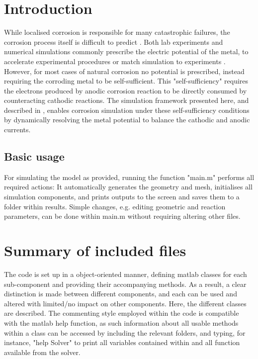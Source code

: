 \documentclass[3p]{elsarticle} %
\begin{document}
\section{Introduction}
While localised corrosion is responsible for many catastrophic failures, the corrosion process itself is difficult to predict \citep{Galvele1976}. Both lab experiments and numerical simulations commonly prescribe the electric potential of the metal, to accelerate experimental procedures or match simulation to experiments \citep{Gravano1984, Sun2021, Laycock2001, Mai2016, Nguyen2022, Li2020}. However, for most cases of natural corrosion no potential is prescribed, instead requiring the corroding metal to be self-sufficient. This "self-sufficiency" requires the electrons produced by anodic corrosion reaction to be directly consumed by counteracting cathodic reactions. The simulation framework presented here, and described in \citep{Hageman2023}, enables corrosion simulation under these self-sufficiency conditions by dynamically resolving the metal potential to balance the cathodic and anodic currents. 

\subsection{Basic usage}
For simulating the model as provided, running the function "main.m" performs all required actions: It automatically generates the geometry and mesh, initialises all simulation components, and prints outputs to the screen and saves them to a folder within results. Simple changes, e.g. editing geometric and reaction parameters, can be done within main.m without requiring altering other files. 

\section{Summary of included files}
The code is set up in a object-oriented manner, defining matlab classes for each sub-component and providing their accompanying methods. As a result, a clear distinction is made between different components, and each can be used and altered with limited/no impact on other components. Here, the different classes are described. The commenting style employed within the code is compatible with the matlab help function, as such information about all usable methods within a class can be accessed by including the relevant folders, and typing, for instance, "help Solver" to print all variables contained within and all function available from the solver. 
\end{document}
